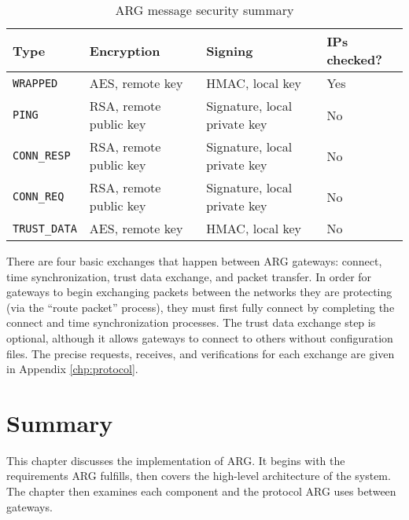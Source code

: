 \begin{table}
\caption{\ac{ARG} message security summary}
\label{tbl:arg_protocol_security}
\centering
\begin{tabular}{l|l|l|l}
\textbf{Type} & \textbf{Encryption} & \textbf{Signing} & \textbf{\acp{IP} checked?}\\
\hline
\texttt{WRAPPED} & AES, remote key & HMAC, local key & Yes\\
\texttt{PING} & RSA, remote public key & Signature, local private key & No\\
\texttt{CONN\_RESP} & RSA, remote public key & Signature, local private key & No\\
\texttt{CONN\_REQ} & RSA, remote public key & Signature, local private key & No\\
\texttt{TRUST\_DATA} & AES, remote key & HMAC, local key & No\\
\end{tabular}
\end{table}

\par There are four basic exchanges that happen between \ac{ARG} gateways: connect, time synchronization, trust data exchange, and packet transfer. In order for gateways to begin exchanging packets between the networks they are protecting (via the ``route packet'' process), they must first fully connect by completing the connect and time synchronization processes. The trust data exchange step is optional, although it allows gateways to connect to others without configuration files. The precise requests, receives, and verifications for each exchange are given in Appendix \ref{chp:protocol}.

\section{Summary}
\par This chapter discusses the implementation of \ac{ARG}. It begins with the requirements \ac{ARG} fulfills, then covers the high-level architecture of the system. The chapter then examines each component and the protocol \ac{ARG} uses between gateways.

